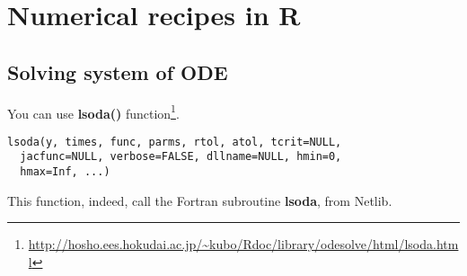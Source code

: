 
\chapter{Numerical recipes in R}
\label{chap:numerical-recipes-r}

\section{Solving system of ODE}
\label{sec:solving-system-ode}

You can use {\bf lsoda()}
function\footnote{\url{http://hosho.ees.hokudai.ac.jp/~kubo/Rdoc/library/odesolve/html/lsoda.html}}.
\begin{lstlisting}
lsoda(y, times, func, parms, rtol, atol, tcrit=NULL, 
  jacfunc=NULL, verbose=FALSE, dllname=NULL, hmin=0, 
  hmax=Inf, ...)

\end{lstlisting}

This function, indeed, call the Fortran subroutine {\bf lsoda}, from Netlib.

